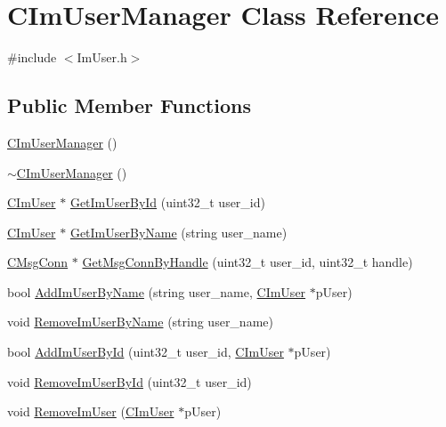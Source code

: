 \hypertarget{class_c_im_user_manager}{}\section{C\+Im\+User\+Manager Class Reference}
\label{class_c_im_user_manager}


{\ttfamily \#include $<$Im\+User.\+h$>$}

\subsection*{Public Member Functions}
\begin{DoxyCompactItemize}
\item 
\hyperlink{class_c_im_user_manager_a7948f76ee16ef1ba03d6c7587df288a5}{C\+Im\+User\+Manager} ()
\item 
\hyperlink{class_c_im_user_manager_aeffddce5039e824ac684e0210ba7bce3}{$\sim$\+C\+Im\+User\+Manager} ()
\item 
\hyperlink{class_c_im_user}{C\+Im\+User} $\ast$ \hyperlink{class_c_im_user_manager_abbc5ab359e468de81a77eb7362e53430}{Get\+Im\+User\+By\+Id} (uint32\+\_\+t user\+\_\+id)
\item 
\hyperlink{class_c_im_user}{C\+Im\+User} $\ast$ \hyperlink{class_c_im_user_manager_a0ab0a7e559540f82d935261f1ac98a72}{Get\+Im\+User\+By\+Name} (string user\+\_\+name)
\item 
\hyperlink{class_c_msg_conn}{C\+Msg\+Conn} $\ast$ \hyperlink{class_c_im_user_manager_ad8e7e6bd1d6be7b22e617f5b3885e036}{Get\+Msg\+Conn\+By\+Handle} (uint32\+\_\+t user\+\_\+id, uint32\+\_\+t handle)
\item 
bool \hyperlink{class_c_im_user_manager_a27ba5f480e19b11a31aceab1f56727e2}{Add\+Im\+User\+By\+Name} (string user\+\_\+name, \hyperlink{class_c_im_user}{C\+Im\+User} $\ast$p\+User)
\item 
void \hyperlink{class_c_im_user_manager_aa62d7f6ffb9c6ad261f29d1f63ab729e}{Remove\+Im\+User\+By\+Name} (string user\+\_\+name)
\item 
bool \hyperlink{class_c_im_user_manager_a024cb1baa6278abf3ba0e276a5f2d349}{Add\+Im\+User\+By\+Id} (uint32\+\_\+t user\+\_\+id, \hyperlink{class_c_im_user}{C\+Im\+User} $\ast$p\+User)
\item 
void \hyperlink{class_c_im_user_manager_a5f481a4acc0b92470445c49833443755}{Remove\+Im\+User\+By\+Id} (uint32\+\_\+t user\+\_\+id)
\item 
void \hyperlink{class_c_im_user_manager_afbd540c01a8eec7bc15e7a576b210e8d}{Remove\+Im\+User} (\hyperlink{class_c_im_user}{C\+Im\+User} $\ast$p\+User)

\end{DoxyCompactItemize}

